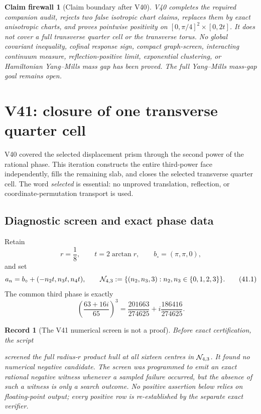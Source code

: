 \documentclass[11pt,oneside]{article}
\newtheorem{firewall}[theorem]{Claim firewall}
\newtheorem{record}[theorem]{Record}
\theoremstyle{definition}
\theoremstyle{remark}
\begin{document}
\begin{firewall}[Claim boundary after V40]
\label{fire:newv40-final}
V40 completes the required companion audit, rejects two false
isotropic chart claims, replaces them by exact anisotropic charts,
and proves pointwise positivity on
\([0,\pi/4]^2\times[0,2t]\).  It does not cover a full transverse
quarter cell or the transverse torus.  No global covariant
inequality, cofinal response sign, compact graph-screen,
interacting continuum measure, reflection-positive limit,
exponential clustering, or Hamiltonian Yang--Mills mass gap has
been proved.  The full Yang--Mills mass-gap goal remains open.
\end{firewall}

\section{V41: closure of one transverse quarter cell}
\label{sec:newv41-quarter-cell}

V40 covered the selected displacement prism through the second
power of the rational phase.  This iteration constructs the entire
third-power face independently, fills the remaining slab, and
closes the selected transverse quarter cell.  The word
\emph{selected} is essential: no unproved translation, reflection,
or coordinate-permutation transport is used.

\subsection{Diagnostic screen and exact phase data}

Retain
\[
 r=\frac18,\qquad t=2\arctan r,\qquad
 b_\circ=(\pi,\pi,0),
\]
and set
\[
 a_n=b_\circ+(-n_2t,n_3t,n_4t),\qquad
 {\cal N}_{4,3}:=\{(n_2,n_3,3):n_2,n_3\in\{0,1,2,3\}\}. \tag{41.1}
\]
The common third phase is exactly
\[
 \left(\frac{63+16i}{65}\right)^3
 =\frac{201663}{274625}
   +i\frac{186416}{274625}.                            \tag{41.2}
\]

\begin{record}[The V41 numerical screen is not a proof]
\label{rec:newv41-screen}
Before exact certification, the script
\begin{center}
\footnotesize
{}
\end{center}
screened the full radius-\(r\) product hull at all sixteen centres
in \({\cal N}_{4,3}\).  It found no numerical negative candidate.
The screen was programmed to emit an exact rational negative
witness whenever a sampled failure occurred, but the absence of
such a witness is only a search outcome.  No positive assertion
below relies on floating-point output; every positive row is
re-established by the separate exact verifier.
\end{record}
\end{document}
